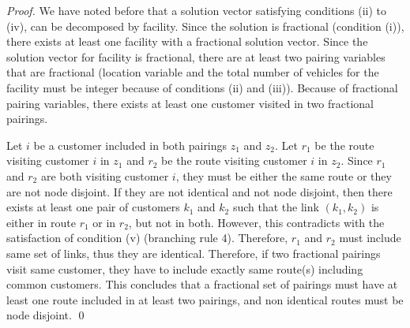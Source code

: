 \begin{proof} 
We have noted before that a solution vector satisfying conditions (ii) to (iv), 
can be decomposed by facility. Since the solution is fractional (condition (i)), 
there exists at least one facility with a fractional solution vector. 
Since the solution vector for facility is fractional, there are at least two 
pairing variables that are fractional (location variable and the total number 
of vehicles for the facility must be integer because of conditions (ii) and (iii)).  
Because of fractional pairing variables, there exists at least one customer 
visited in two fractional pairings. 

Let $i$ be a customer included in both pairings $z_1$ and $z_2$. Let $r_1$ 
be the route visiting customer $i$ in $z_1$ and  $r_2$ be the route visiting 
customer $i$ in $z_2$. Since $r_1$ and $r_2$ are both visiting customer $i$, 
they must be either the same route or they are not node disjoint. 
If they are not identical and not node disjoint, then there exists
at least one pair of customers $k_1$ and $k_2$ such that the link $(k_1,k_2)$ 
is either in route $r_1$ or in $r_2$, but not in both. However, this contradicts 
with the satisfaction of condition (v) (branching rule 4). 
Therefore, $r_1$ and $r_2$ must include same set of links, thus they are
identical. Therefore, if two fractional pairings visit same customer, they have 
to include exactly same route(s) including common customers. This concludes
that a fractional set of pairings must have at least one route included in 
at least two pairings, and non identical routes must be node disjoint.  
\qed
\end{proof}

